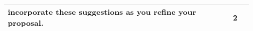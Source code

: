 \begin{longtable}{|p{}|p{}|p{}|}
incorporate these suggestions as you refine your proposal. & 2 \\
\hline
\end{longtable}
